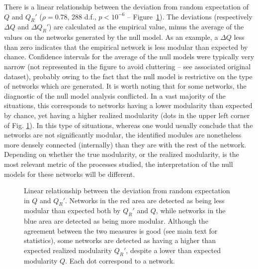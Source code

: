 \documentclass[12pt,oneside]{article}
\begin{document}
There is a linear relationship between the deviation from random
expectation of $Q$ and $Q_R'$ ($\rho = 0.78$, 288 d.f., $p < 10^{-6}$
-- Figure~\ref{f:dnull}). The deviations (respectively $\Delta Q$ and
$\Delta Q_R'$) are calculated as the empirical value, minus the average
of the values on the networks generated by the null model. As an example,
a $\Delta Q$ less than zero indicates that the empirical network is less
modular than expected by chance. Confidence intervals for the average of
the null models were typically very narrow (not represented in the figure to
avoid cluttering -- see associated original dataset), probably owing to the
fact that the null model is restrictive on the type of networks which are
generated. It is worth noting that for some networks, the diagnostic of the
null model analysis conflicted.  In a vast majority of the situations, this
corresponds to networks having a lower modularity than expected by chance,
yet having a higher realized modularity (dots in the upper left corner of
Fig. \ref{f:dnull}). In this type of situations, whereas one would usually
conclude that the networks are not significantly modular, the identified
modules are nonetheless more densely connected (internally) than they are
with the rest of the network. Depending on whether the true modularity, or
the realized modularity, is the most relevant metric of the processes studied,
the interpretation of the null models for these networks will be different.

\begin{figure}[tbp]
\begin{center}
\end{center}
\caption{Linear relationship between the deviation from random expectation in $Q$ and $Q_R'$. Networks in the red area are detected as being less modular than expected both by $Q_R'$ and $Q$, while networks in the blue area are detected as being more modular. Although the agreement between the two measures is good (see main text for statistics), some networks are detected as having a higher than expected realized modularity $Q_R'$, despite a lower than expected modularity $Q$. Each dot correspond to a network.}
\label{f:dnull}
\end{figure}
\end{document}

